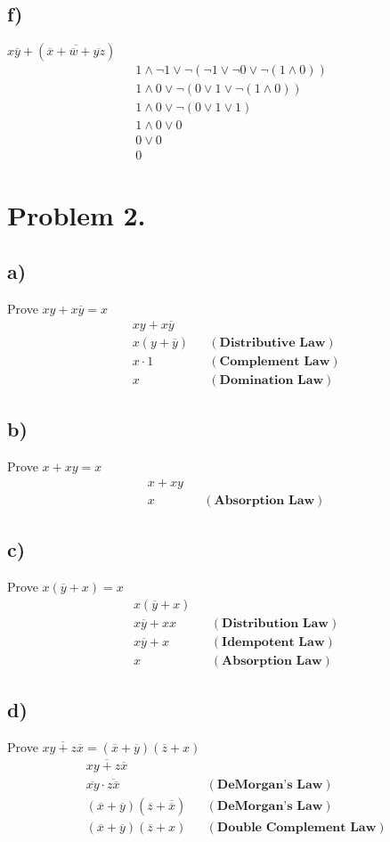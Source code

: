 \documentclass{article}
\begin{document}
\subsection*{f)} 
$x\overline{y}+(\overline{\overline{x}+\overline{w}+\overline{yz}})$
\begin{gather*}
    1\land\neg1\lor\neg(\neg1\lor\neg0\lor\neg(1\land0))\\
    1\land0\lor\neg(0\lor1\lor\neg(1\land0))\\
    1\land0\lor\neg(0\lor1\lor1)\\
    1\land0\lor0\\
    0\lor0\\
    0
\end{gather*}
\clearpage
\section*{Problem 2.}
\subsection*{a)}
Prove $xy + x\overline{y}=x$
\begin{align*}
    & xy + x\overline{y} & & \\
    & x(y+\overline{y}) & & (\textbf{Distributive Law}) \\
    & x\cdot1 & & (\textbf{Complement Law}) \\
    & x & & (\textbf{Domination Law})
\end{align*}
\subsection*{b)}
Prove $x + xy=x$
\begin{align*}
    & x + xy & & \\
    & x & & (\textbf{Absorption Law})
\end{align*}
\subsection*{c)}
Prove $x(\overline{y}+x) = x$
\begin{align*}
    & x(\overline{y}+x) & & \\
    & x\overline{y}+xx & & (\textbf{Distribution Law}) \\
    & x\overline{y}+x & & (\textbf{Idempotent Law}) \\
    & x & & (\textbf{Absorption Law})
\end{align*}
\subsection*{d)}
Prove $\overline{xy+z\overline{x}}=(\overline{x}+\overline{y})(\overline{z}+x)$
\begin{align*}
    & \overline{xy+z\overline{x}} & & \\
    & \overline{xy}\cdot\overline{z\overline{x}} & & (\textbf{DeMorgan's Law}) \\
    & (\overline{x}+\overline{y})(\overline{z}+\overline{\overline{x}}) & & (\textbf{DeMorgan's Law}) \\
    & (\overline{x}+\overline{y})(\overline{z}+x) & & (\textbf{Double Complement Law})
\end{align*}
\clearpage
\end{document}
